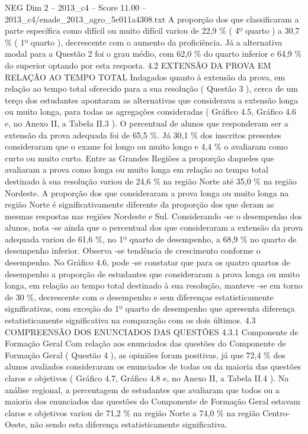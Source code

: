 \begin{textsample}{NEG Dim 2 – 2013\_c4 – Score 11.00 – 2013\_c4/enade\_2013\_agro\_5c011a4308.txt}
A proporção dos que classificaram a parte específica como difícil ou muito difícil variou de 22,9 \% ( 4º quarto ) a 30,7 \% ( 1º quarto ), decrescente com o aumento da proficiência.
Já a alternativa modal para a Questão 2 foi o grau médio, com 62,0 \% do quarto inferior e 64,9 \% do superior optando por esta resposta. 4.2 EXTENSÃO DA PROVA EM RELAÇÃO AO TEMPO TOTAL Indagados quanto à extensão da prova, em relação ao tempo total oferecido para a sua resolução ( Questão 3 ), cerca de um terço dos estudantes apontaram as alternativas que considerava a extensão longa ou muito longa, para todas as agregações consideradas ( Gráfico 4.5, Gráfico 4.6 e, no Anexo II, a Tabela II.3 ).
O percentual de alunos que responderam ser a extensão da prova adequada foi de 65,5 \%.
Já 30,1 \% dos inscritos presentes consideraram que o exame foi longo ou muito longo e 4,4 \% o avaliaram como curto ou muito curto.
Entre as Grandes Regiões a proporção daqueles que avaliaram a prova como longa ou muito longa em relação ao tempo total destinado à sua resolução variou de 24,6 \% na região Norte até 35,0 \% na região Nordeste.
A proporção dos que consideraram a prova longa ou muito longa na região Norte é significativamente diferente da proporção dos que deram as mesmas respostas nas regiões Nordeste e Sul.
Considerando -se o desempenho dos alunos, nota -se ainda que o percentual dos que consideraram a extensão da prova adequada variou de 61,6 \%, no 1º quarto de desempenho, a 68,9 \% no quarto de desempenho inferior.
Observa -se tendência de crescimento conforme o desempenho.
No Gráfico 4.6, pode -se constatar que para os quatro quartos de desempenho a proporção de estudantes que consideraram a prova longa ou muito longa, em relação ao tempo total destinado à sua resolução, manteve -se em torno de 30 \%, decrescente com o desempenho e sem diferenças estatisticamente significativas, com exceção do 1º quarto de desempenho que apresenta diferença estatisticamente significativa na comparação com os dois últimos. 4.3 COMPREENSÃO DOS ENUNCIADOS DAS QUESTÕES 4.3.1 Componente de Formação Geral Com relação aos enunciados das questões do Componente de Formação Geral ( Questão 4 ), as opiniões foram positivas, já que 72,4 \% dos alunos avaliados consideraram os enunciados de todas ou da maioria das questões claros e objetivos ( Gráfico 4.7, Gráfico 4.8 e, no Anexo II, a Tabela II.4 ).
Na análise regional, a percentagem de estudantes que avaliaram que todos ou a maioria dos enunciados das questões do Componente de Formação Geral estavam claros e objetivos variou de 71,2 \% na região Norte a 74,0 \% na região Centro-Oeste, não sendo esta diferença estatisticamente significativa.

\end{textsample}
